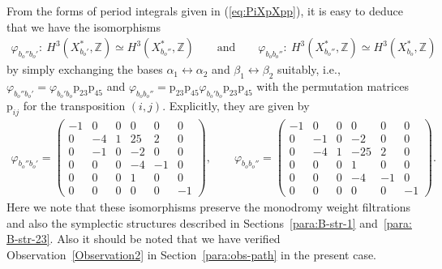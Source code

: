 \documentclass[10pt,a4paper]{amsart}
\numberwithin{equation}{section}
\begin{document}
From the forms of period integrals given in (\ref{eq:PiXpXpp}), it is easy to deduce that we have the isomorphisms
\begin{gather*}
\varphi_{b_{o}''b_{o}'}\colon \ H^{3}(X_{b_{o}'}^{*},\mathbb{Z})\simeq H^{3}(X_{b_{o}''}^{*},\mathbb{Z})\qquad \text{and} \qquad \varphi_{b_{o}b_{o}''}\colon \ H^{3}(X_{b_{o}''}^{*},\mathbb{Z})\simeq H^{3}(X_{b_{o}}^{*},\mathbb{Z})
\end{gather*}
by simply exchanging the bases $\alpha_{1}\leftrightarrow\alpha_{2}$ and $\beta_{1}\leftrightarrow\beta_{2}$ suitably, i.e., $\varphi_{b_{o}''b_{o}'}=\varphi_{b_{o}'b_{o}}\mathrm{p}_{23}\mathrm{p}_{45}$ and $\varphi_{b_{o}b_{o}''}=\mathrm{p}_{23}\mathrm{p}_{45}\varphi_{b_{o}'b_{o}}\mathrm{p}_{23}\mathrm{p}_{45}$ with the permutation matrices $\mathrm{p}_{ij}$ for the transposition $(i,j)$. Explicitly, they are given by
\begin{gather*}
\varphi_{b_{o}''b_{o}'}=\left(\begin{smallmatrix}-1 & 0 & 0 & 0 & 0 & 0\\
0 & -4 & 1 & 25 & 2 & 0\\
0 & -1 & 0 & -2 & 0 & 0\\
0 & 0 & 0 & -4 & -1 & 0\\
0 & 0 & 0 & 1 & 0 & 0\\
0 & 0 & 0 & 0 & 0 & -1
\end{smallmatrix}\right),\qquad \varphi_{b_{o}b_{o}''}=\left(\begin{smallmatrix}-1 & 0 & 0 & 0 & 0 & 0\\
0 & -1 & 0 & -2 & 0 & 0\\
0 & -4 & 1 & -25 & 2 & 0\\
0 & 0 & 0 & 1 & 0 & 0\\
0 & 0 & 0 & -4 & -1 & 0\\
0 & 0 & 0 & 0 & 0 & -1
\end{smallmatrix}\right).
\end{gather*}
Here we note that these isomorphisms preserve the monodromy weight filtrations and also the symplectic structures described in Sections~\ref{para:B-str-1} and~\ref{para: B-str-23}. Also it should be noted that we have verified Observation~\ref{Observation2} in Section~\ref{para:obs-path} in the present case.
\end{document}
